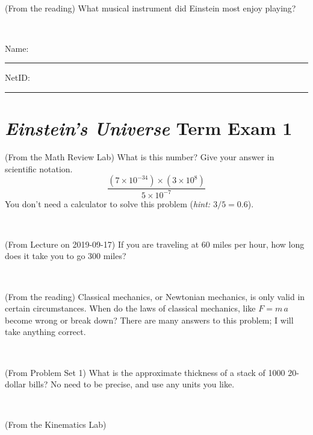 \documentclass[12pt, letterpaper]{article}
\begin{document}
\vfill ~

\begin{problem} (From the reading)
What musical instrument did Einstein most enjoy playing?
\end{problem}


\vfill ~


\cleardoublepage



\noindent
Name: \rule[-1ex]{0.60\textwidth}{0.1pt}
NetID: \rule[-1ex]{0.20\textwidth}{0.1pt}

\section*{\textsl{Einstein's Universe} Term Exam 1}
\setcounter{problem}{1}


\begin{problem} (From the Math Review Lab)
What is this number? Give your answer in scientific notation.
$$
\frac{(7\times10^{-34})\times(3\times10^8)}{5\times10^{-7}}
$$
You don't need a calculator to solve this problem (\textit{hint: $3/5=0.6$}).
\end{problem}


\vfill ~

\begin{problem} (From Lecture on 2019-09-17)
If you are traveling at 60 miles per hour, how long does
it take you to go 300 miles?
\end{problem}


\vfill ~

\begin{problem} (From the reading)
Classical mechanics, or Newtonian mechanics, is only valid in certain
circumstances. When do the laws of classical mechanics, like $F =
m\,a$ become wrong or break down? There are many answers to this
problem; I will take anything correct.
\end{problem}


\vfill ~

\begin{problem} (From Problem Set 1)
What is the approximate thickness of a stack of 1000 20-dollar bills?
No need to be precise, and use any units you like.
\end{problem}


\vfill ~


\clearpage


\begin{problem} (From the Kinematics Lab)

\end{problem}
\end{document}
